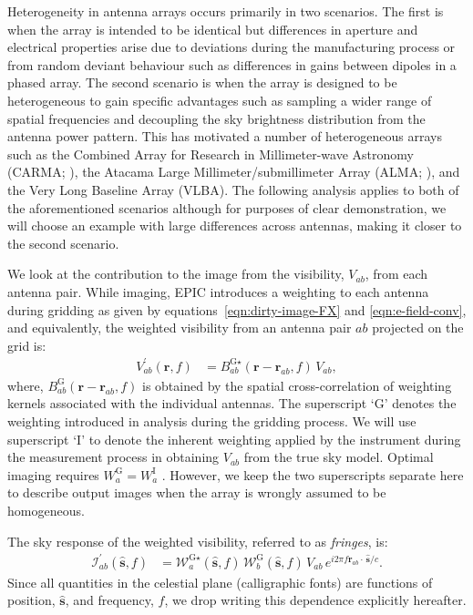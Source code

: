 \documentclass[a4paper,fleqn,usenatbib]{mnras}
\begin{document}
Heterogeneity in antenna arrays occurs primarily in two scenarios. The first is when the array is intended to be identical but differences in aperture and electrical properties arise due to deviations during the manufacturing process or from random deviant behaviour such as differences in gains between dipoles in a phased array. The second scenario is when the array is designed to be heterogeneous to gain specific advantages such as sampling a wider range of spatial frequencies and decoupling the sky brightness distribution from the antenna power pattern. This has motivated a number of heterogeneous arrays such as the Combined Array for Research in Millimeter-wave Astronomy (CARMA; \citealt{woo04,wri10}), the Atacama Large Millimeter/submillimeter Array (ALMA; \citealt{igu09}), and the Very Long Baseline Array (VLBA). The following analysis applies to both of the aforementioned scenarios although for purposes of clear demonstration, we will choose an example with large differences across antennas, making it closer to the second scenario.

We look at the contribution to the image from the visibility, $V_{ab}$, from each antenna pair. While imaging, EPIC introduces a weighting to each antenna during gridding as given by equations~\ref{eqn:dirty-image-FX} and \ref{eqn:e-field-conv}, and equivalently, the weighted visibility from an antenna pair $ab$ projected on the grid is:
\begin{align}
  V^\prime_{ab}(\mathbf{r},f) &= B^{\textrm{G}\star}_{ab}(\mathbf{r}-\mathbf{r}_{ab},f)\,V_{ab},
\end{align}
where, $B^\textrm{G}_{ab}(\mathbf{r}-\mathbf{r}_{ab},f)$ is obtained by the spatial cross-correlation of weighting kernels associated with the individual antennas. The superscript `$\textrm{G}$' denotes the weighting introduced in analysis during the gridding process. We will use superscript `I' to denote the inherent weighting applied by the instrument during the measurement process in obtaining $V_{ab}$ from the true sky model. Optimal imaging requires $W^\textrm{G}_a = W^\textrm{I}_a$ \citep{mor09,mor11}. However, we keep the two superscripts separate here to describe output images when the array is wrongly assumed to be homogeneous.

The sky response of the weighted visibility, referred to as {\it fringes}, is:
\begin{align}
  \mathcal{I}^\prime_{ab}(\hat{\mathbf{s}},f) &= \mathcal{W}^{\textrm{G}\star}_a(\hat{\mathbf{s}},f)\,\mathcal{W}^\textrm{G}_b(\hat{\mathbf{s}},f)\,V_{ab}\,e^{i 2\pi f\mathbf{r}_{ab}\!\cdot\,\hat{\mathbf{s}}/c}.
\end{align}
Since all quantities in the celestial plane (calligraphic fonts) are functions of position, $\hat{\mathbf{s}}$, and frequency, $f$, we drop writing this dependence explicitly hereafter.
\end{document}
